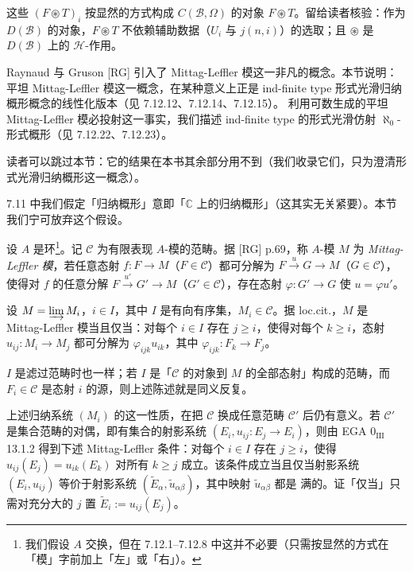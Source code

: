 这些 $(F\circledast T)_i$ 按显然的方式构成 $C(\mathcal{B},\Omega)$ 的对象 $F\circledast T$。留给读者核验：作为 $D(\mathcal{B})$ 的对象，$F\circledast T$ 不依赖辅助数据（$U_i$ 与 $j(n,i)$）的选取；且 $\circledast$ 是 $D(\mathcal{B})$ 上的 $\mathcal{H}$-作用。


Raynaud 与 Gruson [RG] 引入了 Mittag-Leffler 模这一非凡的概念。本节说明：平坦 Mittag-Leffler 模这一概念，在某种意义上正是 ind-finite type 形式光滑归纳概形概念的线性化版本（见 7.12.12、7.12.14、7.12.15）。
%
利用可数生成的平坦 Mittag-Leffler 模必投射这一事实，我们描述 ind-finite type 的形式光滑仿射 $\aleph_0$-形式概形（见 7.12.22、7.12.23）。

读者可以跳过本节：它的结果在本书其余部分用不到（我们收录它们，只为澄清形式光滑归纳概形这一概念）。

7.11 中我们假定「归纳概形」意即「$\mathbb{C}$ 上的归纳概形」（这其实无关紧要）。本节我们宁可放弃这个假设。

 设 $A$ 是环\footnote{我们假设 $A$ 交换，但在 7.12.1--7.12.8 中这并不必要（只需按显然的方式在「模」字前加上「左」或「右」）。}。记 $\mathcal{C}$ 为有限表现 $A$-模的范畴。据 [RG] p.69，称 $A$-模 $M$ 为 \emph{Mittag-Leffler 模}，若任意态射 $f:F\to M$（$F\in\mathcal{C}$）都可分解为 $F\xrightarrow{u}G\to M$（$G\in\mathcal{C}$），使得对 $f$ 的任意分解 $F\xrightarrow{u'}G'\to M$（$G'\in\mathcal{C}$），存在态射 $\varphi:G'\to G$ 使 $u=\varphi u'$。

 设 $M=\varinjlim M_i$，$i\in I$，其中 $I$ 是有向有序集，$M_i\in\mathcal{C}$。据 loc.cit.，$M$ 是 Mittag-Leffler 模当且仅当：对每个 $i\in I$ 存在 $j\ge i$，使得对每个 $k\ge i$，态射 $u_{ij}:M_i\to M_j$ 都可分解为 $\varphi_{ijk}u_{ik}$，其中 $\varphi_{ijk}:F_k\to F_j$。

$I$ 是滤过范畴时也一样；若 $I$ 是「$\mathcal{C}$ 的对象到 $M$ 的全部态射」构成的范畴，而 $F_i\in\mathcal{C}$ 是态射 $i$ 的源，则上述陈述就是同义反复。

 上述归纳系统 $(M_i)$ 的这一性质，在把 $\mathcal{C}$ 换成任意范畴 $\mathcal{C}'$ 后仍有意义。若 $\mathcal{C}'$ 是集合范畴的对偶，即有集合的射影系统 $(E_i,u_{ij}:E_j\to E_i)$，则由 EGA $0_{\mathrm{III}}$ 13.1.2 得到下述 Mittag-Leffler 条件：对每个 $i\in I$ 存在 $j\ge i$，使得 $u_{ij}(E_j)=u_{ik}(E_k)$ 对所有 $k\ge j$ 成立。该条件成立当且仅当射影系统 $(E_i,u_{ij})$ 等价于射影系统 $(\tilde E_{\alpha},\tilde u_{\alpha\beta})$，其中映射 $\tilde u_{\alpha\beta}$ 都是%
%
满的。证「仅当」只需对充分大的 $j$ 置 $\tilde E_i:=u_{ij}(E_j)$。

